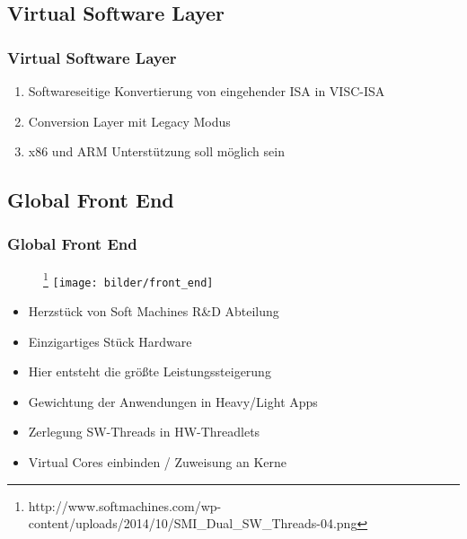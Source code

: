 \documentclass[xcolor=dvipsnames]{beamer}
\begin{document}
\subsection{Virtual Software Layer}
\begin{frame}
\frametitle{Virtual Software Layer}
	\begin{enumerate}
		\item Softwareseitige Konvertierung von eingehender ISA in VISC-ISA
		\item Conversion Layer mit Legacy Modus 
		\item x86 und ARM Unterstützung soll möglich sein
	\end{enumerate}
\end{frame}	

\subsection{Global Front End}
\begin{frame}
\frametitle{Global Front End}
\begin{figure}
\footnote{http://www.softmachines.com/wp-content/uploads/2014/10/SMI\_Dual\_SW\_Threads-04.png}
\texttt{[image: bilder/front\_end]}
\end{figure}
\begin{itemize}
\item Herzstück von Soft Machines R\&D Abteilung
\item Einzigartiges Stück Hardware
\item Hier entsteht die größte Leistungssteigerung
\item Gewichtung der Anwendungen in Heavy/Light Apps
\item Zerlegung SW-Threads in HW-Threadlets
\item Virtual Cores einbinden / Zuweisung an Kerne 
\end{itemize}
	
\end{frame}
\end{document}

